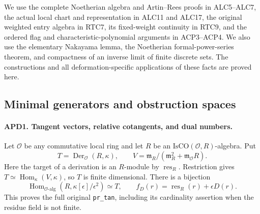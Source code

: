 We use the complete Noetherian algebra and Artin--Rees proofs in
ALC5--ALC7, the actual local chart and representation in ALC11 and
ALC17, the original weighted entry algebra in RTC7, its fixed-weight
continuity in RTC9, and the ordered flag and characteristic-polynomial
arguments in ACP3--ACP4.  We also use the elementary Nakayama lemma,
the Noetherian formal-power-series theorem, and compactness of an
inverse limit of finite discrete sets.  The constructions and all
deformation-specific applications of these facts are proved here.

\subsection{Minimal generators and obstruction spaces}

\paragraph{APD1. Tangent vectors, relative cotangents, and dual numbers.}
\label{claim:APD1}
Let \(\mathcal O\) be any commutative local ring and let
\(R\) be an \(\mathrm{IsCO}(\mathcal O,R)\)-algebra.  Put
\[
 T=\operatorname{Der}_{\mathcal O}(R,\kappa),\qquad
 V=\mathfrak m_R/(\mathfrak m_R^2+
                         \mathfrak m_{\mathcal O}R).
                                                               \tag{APD.3}
\]
Here the target of a derivation is an \(R\)-module by
\(\operatorname{res}_R\).  Restriction gives
\(T\simeq\operatorname{Hom}_\kappa(V,\kappa)\), so \(T\)
is finite dimensional.  There is a bijection
\[
 \operatorname{Hom}_{\mathcal O\text{-alg}}
       (R,\kappa[\epsilon]/\epsilon^2)\simeq T,
 \qquad f_D(r)=\operatorname{res}_R(r)+\epsilon D(r).
                                                               \tag{APD.4}
\]
This proves the full original \texttt{pr\_tan}, including its
cardinality assertion when the residue field is not finite.

